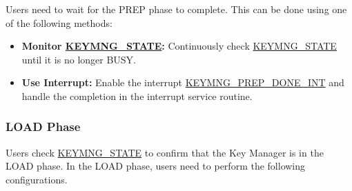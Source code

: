 \documentclass[main\_\_EN.tex]{subfiles}
\begin{document}
Users need to wait for the PREP phase to complete. This can be done using one of the following methods:
\begin{itemize}
    \item \textbf{Monitor \hyperref[fielddesc:KEYMNGSTATE]{KEYMNG\_STATE}:} Continuously check \hyperref[fielddesc:KEYMNGSTATE]{KEYMNG\_STATE} until it is no longer BUSY.
    \item \textbf{Use Interrupt:} Enable the interrupt \hyperref[int:KEYMNGPREPDONEINT]{KEYMNG\_PREP\_DONE\_INT} and handle the completion in the interrupt service routine.
\end{itemize}


\subsubsection{LOAD Phase}
Users check \hyperref[fielddesc:KEYMNGSTATE]{KEYMNG\_STATE} to confirm that the Key Manager is in the LOAD phase. In the LOAD phase, users need to perform the following configurations.
\end{document}
